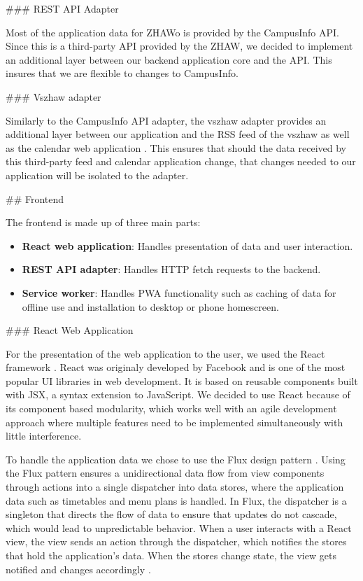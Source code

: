 \begin{markdown}
### REST API Adapter

Most of the application data for ZHAWo is provided by the CampusInfo API. Since this is a third-party API provided by the ZHAW, we decided to implement an additional layer between our backend application core and the API. This insures that we are flexible to changes to CampusInfo.

### Vszhaw adapter

Similarly to the CampusInfo API adapter, the vszhaw adapter provides an additional layer between our application and the RSS feed \cite{VszhawNews} of the vszhaw as well as the calendar web application \cite{VszhawCalendar}. This ensures that should the data received by this third-party feed and calendar application change, that changes needed to our application will be isolated to the adapter.

## Frontend

The frontend is made up of three main parts:

\begin{itemize}
  \item \textbf{React web application}: Handles presentation of data and user interaction.
  \item \textbf{REST API adapter}: Handles HTTP fetch requests to the backend.
  \item \textbf{Service worker}: Handles PWA functionality such as caching of data for offline use and installation to desktop or phone homescreen.
\end{itemize}

### React Web Application

For the presentation of the web application to the user, we used the React framework \cite{React}. React was originaly developed by Facebook and is one of the most popular UI libraries in web development. It is based on reusable components built with JSX, a syntax extension to JavaScript. We decided to use React because of its component based modularity, which works well with an agile development approach where multiple features need to be implemented simultaneously with little interference.

To handle the application data we chose to use the Flux design pattern \cite{Flux}. Using the Flux pattern ensures a unidirectional data flow from view components through actions into a single dispatcher into data stores, where the application data such as timetables and menu plans is handled. In Flux, the dispatcher is a singleton that directs the flow of data to ensure that updates do not cascade, which would lead to unpredictable behavior. When a user interacts with a React view, the view sends an action through the dispatcher, which notifies the stores that hold the application’s data. When the stores change state, the view gets notified and changes accordingly \cite{Flux}.


\end{markdown}
